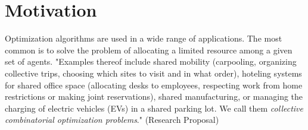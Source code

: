 \documentclass[german, a4paper, 11pt, oneside]{scrbook}
\begin{document}
\chapter{Motivation}
\label{sec:motivation}
Optimization algorithms are used in a wide range of applications. The most common is to solve the problem of allocating a limited resource among a given set of agents.  "Examples thereof include shared mobility (carpooling, organizing collective trips, choosing which sites to visit and in what order), hoteling systems for shared office space (allocating desks to employees, respecting work from home restrictions or making joint reservations), shared manufacturing, or managing the charging of electric vehicles (EVs) in a shared parking lot. We call them \emph{collective combinatorial optimization problems}." (Research Proposal) \\
\end{document}
